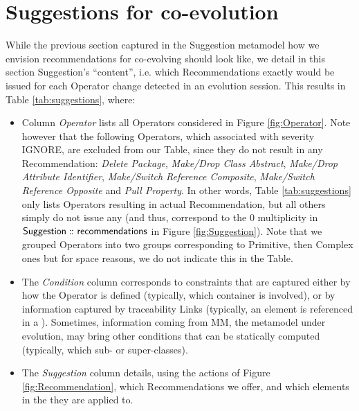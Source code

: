 \section{Suggestions for \viewtype co-evolution} 
\label{sec:Approach}


While the previous section captured in the \textsf{Suggestion} metamodel how we
envision recommendations for co-evolving \viewtypes should look like, we detail
in this section \textsf{Suggestion}'s ``content'', i.e. which \textsf{Recommendation}s
exactly would be issued for each \textsf{Operator} change detected in an evolution
session. This results in Table \ref{tab:suggestions}, where:
\begin{itemize}
	\item Column \textsl{Operator} lists all \textsf{Operator}s considered in Figure
	\ref{fig:Operator}. Note however that the following \textsf{Operator}s, which 
	associated with severity \textsf{IGNORE}, are excluded from our Table, since 
	they do not result in any \textsf{Recommendation}: \textit{Delete Package}, 
	\textit{Make/Drop Class Abstract}, \textit{Make/Drop Attribute Identifier}, 
	\textit{Make/Switch Reference Composite}, \textit{Make/Switch Reference Opposite}
	and \textit{Pull Property}. In other words, Table \ref{tab:suggestions} only
	lists \textsf{Operator}s resulting in actual \textsf{Recommendation}, but all
	others simply do not issue any (and thus, correspond to the \textsf{0} multiplicity
	in $\mathsf{Suggestion} \,\colon\!\!\!\colon \mathsf{recommendations}$ in Figure 
	\ref{fig:Suggestion}). Note that we grouped \textsf{Operator}s into two groups corresponding to 
	\textsf{Primitive}, then \textsf{Complex} ones but for space reasons, we do not
	indicate this in the Table.
	
	\item The \textsl{Condition} column corresponds to constraints that are captured
	either by how the \textsf{Operator} is defined (typically, which \textsf{container}
	is involved), or by information captured by traceability \textsf{Link}s (typically,
	an element is referenced in a \viewtype). Sometimes, information coming from \textsf{MM},
	the metamodel under evolution, may bring other conditions that can be statically
	computed (typically, which sub- or super-classes). 
	
	\item The \textsl{Suggestion} column details, using the actions of Figure 
	\ref{fig:Recommendation}, which \textsf{Recommendation}s we offer, and which
	elements in the \viewtype they are applied to.
\end{itemize}



